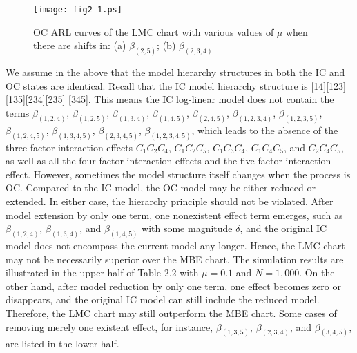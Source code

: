 \begin{figure}[ht]
\begin{center}
\texttt{[image: fig2-1.ps]}
\vspace{-0.5cm} \caption{\small OC ARL curves of the LMC chart with various values
of $\mu$ when there are shifts in: (a) $\beta_{(2,5)}$; (b)
$\beta_{(2,3,4)}$}\vspace{-0.3cm}
\end{center}
\end{figure}


We assume in the above that the model hierarchy structures in both the IC and OC
states are identical. Recall that the IC model hierarchy structure is
[14][123][135][234][235] [345]. This means the IC log-linear model does not contain
the terms $\beta_{(1,2,4)}$, $\beta_{(1,2,5)}$, $\beta_{(1,3,4)}$,
$\beta_{(1,4,5)}$, $\beta_{(2,4,5)}$, $\beta_{(1,2,3,4)}$, $\beta_{(1,2,3,5)}$,
$\beta_{(1,2,4,5)}$, $\beta_{(1,3,4,5)}$, $\beta_{(2,3,4,5)}$,
$\beta_{(1,2,3,4,5)}$, which leads to the absence of the three-factor interaction
effects $C_1C_2C_4$, $C_1C_2C_5$, $C_1C_3C_4$, $C_1C_4C_5$, and $C_2C_4C_5$, as well
as all the four-factor interaction effects and the five-factor interaction effect.
However, sometimes the model structure itself changes when the process is OC.
Compared to the IC model, the OC model may be either reduced or extended. In either
case, the hierarchy principle should not be violated. After model extension by only
one term, one nonexistent effect term emerges, such as $\beta_{(1,2,4)}$,
$\beta_{(1,3,4)}$, and $\beta_{(1,4,5)}$ with some magnitude $\delta$, and the
original IC model does not encompass the current model any longer. Hence, the LMC
chart may not be necessarily superior over the MBE chart. The simulation results are
illustrated in the upper half of Table 2.2 with $\mu=0.1$ and $N=1,000$. On the
other hand, after model reduction by only one term, one effect becomes zero or
disappears, and the original IC model can still include the reduced model.
Therefore, the LMC chart may still outperform the MBE chart. Some cases of removing
merely one existent effect, for instance, $\beta_{(1,3,5)}$, $\beta_{(2,3,4)}$, and
$\beta_{(3,4,5)}$, are listed in the lower half.

